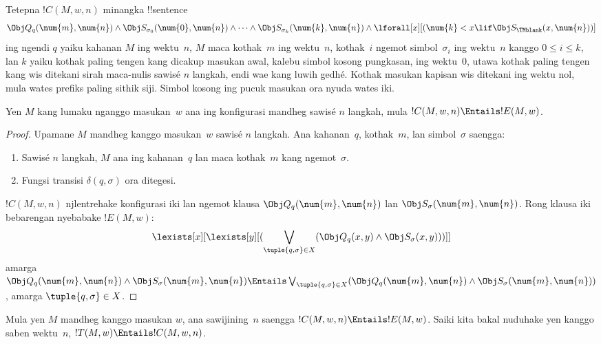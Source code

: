 \documentclass[../../../include/open-logic-section]{subfiles}
\begin{document}
\begin{defn} 
Tetepna $!C(M, w, n)$ minangka !!{sentence}
\[ 
\Obj Q_q(\num{m}, \num{n}) \land \Obj S_{\sigma_0}(\num{0}, \num{n})
\land \dots \land \Obj S_{\sigma_k}(\num{k}, \num{n}) \land
\lforall[x][(\num{k} < x \lif \Obj S_\TMblank(x, \num{n}))]
\] 
ing ngendi $q$ yaiku kahanan $M$ ing wektu~$n$,
$M$ maca kothak~$m$ ing wektu~$n$, kothak~$i$
ngemot simbol~$\sigma_i$ ing wektu~$n$ kanggo
$0 \le i \le k$, lan $k$ yaiku kothak paling
tengen kang dicakup masukan awal, kalebu simbol kosong pungkasan, ing wektu~$0$,
utawa kothak paling tengen kang wis ditekani
sirah maca-nulis sawisé $n$ langkah, endi
wae kang luwih gedhé. Kothak masukan kapisan wis ditekani ing wektu nol, mula wates prefiks paling sithik siji. Simbol kosong ing pucuk masukan ora nyuda wates iki.
\end{defn}

\begin{lem}
Yen $M$ kang lumaku nganggo masukan~$w$
ana ing konfigurasi mandheg sawisé $n$
langkah, mula $!C(M, w, n) \Entails !E(M, w)$.
\end{lem}

\begin{proof}
Upamane $M$ mandheg kanggo masukan~$w$
sawisé $n$ langkah. Ana kahanan~$q$,
kothak~$m$, lan simbol~$\sigma$ saengga:
\begin{enumerate} 
\item Sawisé $n$ langkah, $M$ ana ing
  kahanan~$q$ lan maca kothak~$m$
  kang ngemot~$\sigma$.
\item Fungsi transisi $\delta(q, \sigma)$
  ora ditegesi.
\end{enumerate}
$!C(M, w, n)$ njlentrehake konfigurasi iki
lan ngemot klausa $\Obj Q_{q}(\num{m}, \num{n})$
lan $\Obj S_{\sigma}(\num{m}, \num{n})$.
Rong klausa iki bebarengan nyebabake
$!E(M, w)$:
\[
\lexists[x][\lexists[y][(\bigvee_{\tuple{q, \sigma} \in
      X}(\Obj Q_q(x, y) \land \Obj S_\sigma(x, y)))]]
\]
amarga $\Obj Q_q(\num{m}, \num{n}) \land \Obj S_\sigma(\num{m},
\num{n}) \Entails \bigvee_{\tuple{q, \sigma} \in X} (\Obj Q_q(\num{m},
\num{n}) \land \Obj S_{\sigma}(\num{m}, \num{n}))$,
amarga $\tuple{q,\sigma} \in X$.
\end{proof}

\begin{explain}
Mula yen $M$ mandheg kanggo masukan $w$,
ana sawijining~$n$ saengga $!C(M, w, n)
\Entails !E(M,w)$. Saiki kita bakal
nuduhake yen kanggo saben wektu~$n$,
$!T(M, w) \Entails !C(M, w, n)$.
\end{explain}
\end{document}
